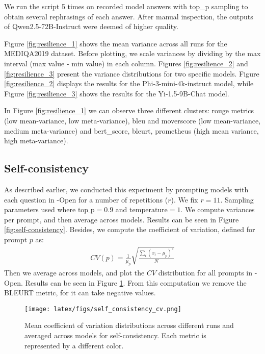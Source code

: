 We run the script 5 times on recorded model answers with top\_p sampling to obtain several rephrasings of each answer. After manual inspection, the outputs of Qwen2.5-72B-Instruct were deemed of higher quality.

Figure \ref{fig:resilience_1} shows the mean variance across all runs for the MEDIQA2019 dataset. Before plotting, we scale variances by dividing by the max interval (max value - min value) in each column. Figures \ref{fig:resilience_2} and \ref{fig:resilience_3} present the variance distributions for two specific models. Figure \ref{fig:resilience_2} displays the results for the Phi-3-mini-4k-instruct model, while Figure \ref{fig:resilience_3} shows the results for the Yi-1.5-9B-Chat model.




In Figure \ref{fig:resilience_1} we can observe three different clusters: rouge metrics (low mean-variance, low meta-variance), bleu and moverscore (low mean-variance, medium meta-variance) and bert\_score, bleurt, prometheus (high mean variance, high meta-variance).

\subsection{Self-consistency}\label{apx:self-consistency}

As described earlier, we conducted this experiment by prompting models with each question in \careqa{}-Open for a number of repetitions ($r$). We fix $r=11$. Sampling parameters used where $\text{top\_p} = 0.9$ and $\text{temperature} = 1$. We compute variances per prompt, and then average across models. Results can be seen in Figure \ref{fig:self-consistency}. Besides, we compute the coefficient of variation, defined for prompt $p$ as:
\begin{align*}
    CV(p) = \frac{1}{\mu_p}\sqrt{\frac{\sum_i(x_i - \mu_p)^2}{N}}
\end{align*}
Then we average across models, and plot the $CV$ distribution for all prompts in \careqa{}-Open. Results can be seen in Figure \ref{fig:self-consistency_cv}. From this computation we remove the BLEURT metric, for it can take negative values.

\begin{figure}[h]
    \centering
    \texttt{[image: latex/figs/self\_consistency\_cv.png]}
    \caption{Mean coefficient of variation distributions across different runs and averaged across models for self-consistency. Each metric is represented by a different color.}
    \label{fig:self-consistency_cv}
\end{figure} 